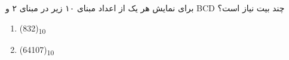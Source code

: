 برای نمایش هر یک از اعداد مبنای ۱۰ زیر در مبنای ۲ و BCD چند بیت نیاز است؟

\begin{latin}
	\begin{enumerate}
		\item 
		(832)\textsubscript{10}
		
		\item 
		(64107)\textsubscript{10}
	\end{enumerate}
\end{latin}